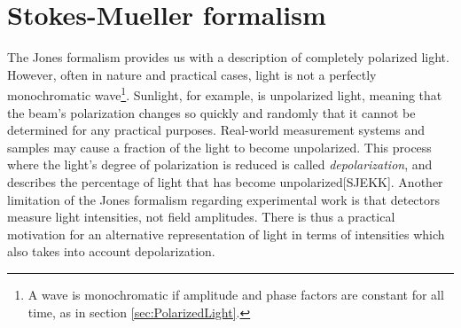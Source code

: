 \section{Stokes-Mueller formalism}
The Jones formalism provides us with a description of completely polarized light. However, often in nature and practical cases, light is not a perfectly monochromatic wave\footnote{A wave is monochromatic if amplitude and phase factors are constant for all time, as in section \ref{sec:PolarizedLight}.}. Sunlight, for example, is unpolarized light, meaning that the beam's polarization changes so quickly and randomly that it cannot be determined for any practical purposes. Real-world measurement systems and samples may cause a fraction of the light to become unpolarized. This process where the light's degree of polarization is reduced is called \emph{depolarization}, and describes the percentage of light that has become unpolarized\cite{hans_arwin}[SJEKK]. Another limitation of the Jones formalism regarding experimental work is that detectors measure light intensities, not field amplitudes. There is thus a practical motivation for an alternative representation of light in terms of intensities which also takes into account depolarization.

